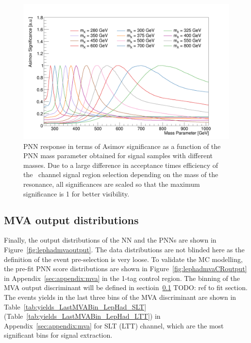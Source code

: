 \begin{figure}[htbp]
\centering
\includegraphics[width=0.85\linewidth]{DiHiggs/plots/mass_response.png}
\caption{
    PNN response in terms of Asimov significance as a function of the PNN mass parameter obtained for
signal samples with different masses. Due to a large difference in acceptance times
efficiency of the \lephad\ channel signal region selection depending on the mass of the resonance, 
all significances are scaled so that the maximum significance is 1 for better visibility.}
\label{fig:MVA:mass-response}
\end{figure}



\subsection{MVA output distributions}
Finally, the output distributions of the NN and the PNNs are shown in 
Figure~\ref{fig:lephadmvaoutput}. 
The data distributions are not blinded here as the definition of the event
pre-selection is very loose. 
To validate the MC modelling, the pre-fit PNN score distributions are shown in 
Figure~\ref{fig:lephadmvaCRoutput} in Appendix~\ref{sec:appendix:mva} in the 1-tag control region. 
The binning of the MVA output discriminant will be defined in sectioin~\ref{} TODO:
ref to fit section. 
The events yields in the last three bins of the MVA discriminant are shown in 
Table~\ref{tab:yields_LastMVABin_LepHad_SLT} (Table~\ref{tab:yields_LastMVABin_LepHad_LTT}) 
in Appendix~\ref{sec:appendix:mva} for SLT (LTT) channel, which are the most significant bins
for signal extraction. 



